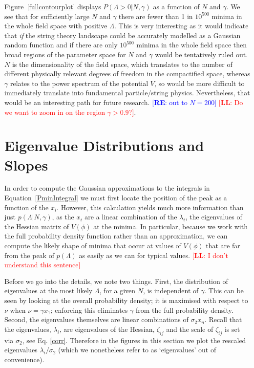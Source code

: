 \documentclass[12pt]{article}
\newcommand{\re}[1]{\textcolor{blue}{[{\bf RE}: #1]}}
\newcommand{\lfl}[1]{\textcolor{red}{[{\bf LL}: #1]}}
\begin{document}
Figure~\ref{fullcontourplot} displays  $P(\Lambda >0 |N,\gamma)$ as a function of $N$ and $\gamma$. We see that for sufficiently large $N$ and $\gamma$ there are fewer than 1 in $10^{500}$ minima in the whole field space with positive $\Lambda$. This is very interesting as it would indicate that \emph{if} the string theory landscape could be accurately modelled as a Gaussian random function and if there are only $10^{500}$ minima in the whole field space then broad regions of the parameter space for $N$ and $\gamma$ would be tentatively ruled out. $N$ is the dimensionality of the field space, which translates to the number of different physically relevant degrees of freedom in the compactified space, whereas $\gamma$ relates to the power spectrum of the potential $V$, so would be more difficult to immediately translate into fundamental particle/string physics. Nevertheless, that would be an interesting path for future research. \re{out to $N=200$} \lfl{Do we want to zoom in on the region $\gamma > 0.9$?}.


\section{Eigenvalue Distributions and Slopes} 

In order to compute the Gaussian  approximations to the integrals in Equation~\ref{PminIntegral} we must first locate the position of the peak as a function of the $x_i$. However, this calculation yields much more information than just $p(\Lambda  |N,\gamma)$, as the $x_i$ are a linear combination of the $\lambda_i$, the eigenvalues of the Hessian matrix of $V(\phi)$ at the minima. In particular, because we work with the full probability density function rather than an approximation, we can compute the likely shape of minima that occur at values of $V(\phi)$ that  are  far from the peak of $p(\Lambda)$ as easily as we can for typical values. \lfl{I don't understand this sentence}

Before we go into the details, we note two things. First, the distribution of eigenvalues at the most likely $\Lambda$, for a given $N$, is independent of $\gamma$. This can be seen by looking at the overall probability density; it is maximised with respect to $\nu$ when $\nu = \gamma x_1$; enforcing this eliminates $\gamma$ from the full  probability density. Second, the eigenvalues themselves are linear combinations of $\sigma_2x_n$. Recall that the eigenvalues, $\lambda_i$, are eigenvalues of the Hessian, $\zeta_{ij}$ and the scale of $\zeta_{ij}$ is set via $\sigma_2$, see Eq. \eqref{corr}. Therefore in the figures in this section we plot the rescaled eigenvalues $\lambda_i/\sigma_2$ (which we nonetheless refer to as `eigenvalues' out of convenience).
\end{document}
